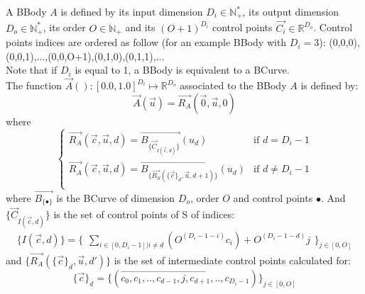 A BBody $A$ is defined by its input dimension $D_i\in\mathbb{N}^*_+$, its output dimension $D_o\in\mathbb{N}^*_+$, its order $O\in\mathbb{N_+}$ and its $(O+1)^{D_i}$ control points $\overrightarrow{C_i}\in\mathbb{R}^{D_o}$. Control points indices are ordered as follow (for an example BBody with $D_i=3$): (0,0,0),(0,0,1),...,(0,0,O+1),(0,1,0),(0,1,1),... \\
Note that if $D_i$ is equal to 1, a BBody is equivalent to a BCurve.\\
The function $\overrightarrow{A}():[0.0,1.0]^{D_i}\mapsto\mathbb{R}^{D_o}$ associated to the BBody $A$ is defined by:\\
\begin{equation}
\overrightarrow{A}(\overrightarrow{u})=\overrightarrow{R_A}(\overrightarrow{0},\overrightarrow{u},0)
\end{equation}
where
\begin{equation}
\left\lbrace
\begin{array}{ll}
\overrightarrow{R_A}(\overrightarrow{c},\overrightarrow{u},d)=\overrightarrow{B_{\lbrace\overrightarrow{C}_{I(\overrightarrow{c},d)}\rbrace}}(u_d)&\textrm{if }d=D_i-1\\
\overrightarrow{R_A}(\overrightarrow{c},\overrightarrow{u},d)=\overrightarrow{B_{\lbrace\overrightarrow{R_S}(\lbrace\overrightarrow{c}\rbrace_d,\overrightarrow{u},d+1)\rbrace}}(u_d)&\textrm{if }d\ne D_i-1\\
\end{array}
\right.
\end{equation}
where $\overrightarrow{B_{\lbrace\bullet\rbrace}}$ is the BCurve of dimension $D_o$, order $O$ and control points $\bullet$. And $\lbrace\overrightarrow{C}_{I(\overrightarrow{c},d)}\rbrace$ is the set of control points of S of indices:\\
\begin{equation}
\lbrace I(\overrightarrow{c},d)\rbrace=\lbrace
\begin{array}{l}
\sum_{i\in[0,D_i-1]|i\ne d}\left(O^{(D_i-1-i)}c_i\right)+O^{(D_i-1-d)}j
\end{array}
\rbrace_{j\in[0,O]}
\end{equation}
and $\lbrace\overrightarrow{R_A}(\lbrace\overrightarrow{c}\rbrace_d,\overrightarrow{u},d')\rbrace$ is the set of intermediate control points calculated for:\\
\begin{equation}
\lbrace\overrightarrow{c}\rbrace_d=\lbrace(\overrightarrow{c_0,c_1,..,c_{d-1},j,c_{d+1},..,c_{D_i-1}})\rbrace_{j\in[0,O]}
\end{equation}


